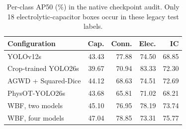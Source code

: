 \begin{table}[!t]\centering
\caption{Per-class AP50 (\%) in the native checkpoint audit. Only 18 electrolytic-capacitor boxes occur in these legacy test labels.}
\label{tab:nativeclasses}\footnotesize\setlength{\tabcolsep}{3pt}
\begin{tabular}{lrrrr}\toprule
Configuration & Cap. & Conn. & Elec. & IC\\\midrule
YOLOv12s & 43.43 & 77.88 & 74.50 & 68.85 \\
Crop-trained YOLO26s & 39.67 & 70.94 & 83.33 & 72.30 \\
AGWD + Squared-Dice & 44.12 & 68.63 & 74.51 & 72.69 \\
PhysOT-YOLO26s & 43.68 & 65.81 & 71.02 & 68.21 \\
WBF, two models & 45.10 & 76.95 & 78.19 & 73.74 \\
WBF, four models & 47.04 & 78.85 & 73.31 & 75.77 \\
\bottomrule\end{tabular}\end{table}
